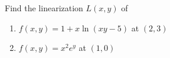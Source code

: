 \documentclass[12pt]{amsart}
\begin{document}
\begin{question}
	Find the linearization $L(x,y)$ of
	\begin{enumerate}
		\item $f(x,y) = 1 + x\ln (xy - 5)$ at $(2,3)$
		      \vspace{7cm}
		\item $f(x,y) = x^2 e^y$ at $(1,0)$
		      \vspace{7cm}
	\end{enumerate}
\end{question}
\end{document}
